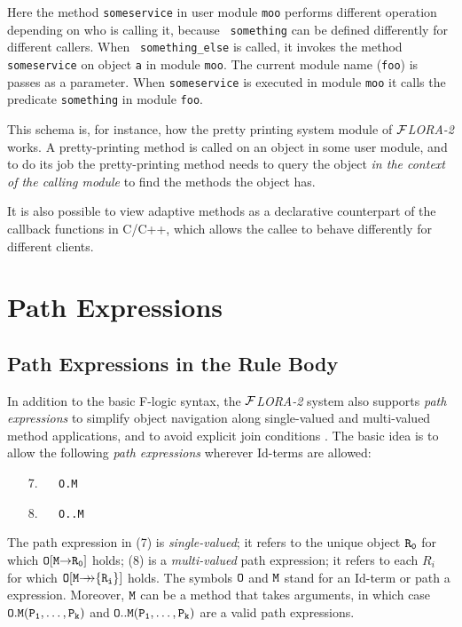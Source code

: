 \documentclass[11pt]{article}
\newcommand{\fd}{\ensuremath{{\rightarrow}}}                   %
\newcommand{\mvd}{\ensuremath{{\rightarrow\!\!\!\!\rightarrow}}}  %
\newcommand{\FLORA}{{\mbox{${\cal F}${\small\it LORA}\rm\emph{-2}}}\xspace}
\newcommand{\fl}{\mbox{F-logic}\xspace}
\begin{document}
  Here the method {\tt someservice} in user module {\tt moo} performs
  different operation depending on who is calling it, because {\tt
    something} can be defined differently for different callers.  When {\tt
    something\_else} is called, it invokes the method {\tt someservice} on
  object {\tt a} in module {\tt moo}. The current module name ({\tt foo})
  is passes as a parameter. When {\tt someservice} is executed in module
  {\tt moo} it calls the predicate {\tt something} in module {\tt foo}.
  
  This schema is, for instance, how the pretty printing system module of
  \FLORA works. A pretty-printing method is called on an object in some
  user module, and to do its job the pretty-printing method needs to query
  the object \emph{in the context of the calling module} to find the
  methods the object has.

It is also possible to view adaptive methods as a declarative counterpart
of the callback functions in C/C++, which allows the callee to behave
differently for different clients.


\section{Path Expressions}\label{sec-pathexpr}

\subsection{Path Expressions in the Rule Body}


 
In addition to the basic \fl syntax, the \FLORA  system also supports
\emph{path expressions} to simplify object navigation along
single-valued and multi-valued method applications, and to avoid
explicit join conditions \cite{frohn-lausen-uphoff-VLDB-94}.  The
basic idea is to allow the following \emph{path expressions} wherever
Id-terms are allowed:

  \medskip

\begin{enumerate} 
\item[7.]\label{eq-path-fun} ~~ {\tt O.M}
\item[8.]\label{eq-path-set} ~~ {\tt O..M} 
\end{enumerate} \medskip

\noindent
The path expression in (7) is \emph{single-valued}; it refers to the unique
object $\tt R_0$ for which $\tt O[M\fd R_0]$ holds; (8) is a
\emph{multi-valued} path expression; it refers to each $R_i$ for which $\tt
O[M\mvd\{R_i\}]$ holds.  The symbols $\tt O$ and $\tt M$ stand for an
Id-term or path a expression.  Moreover, $\tt M$ can be a method that takes
arguments, in which case $\tt O.M(P_1,\dots,P_k)$ and $\tt
O..M(P_1,\dots,P_k)$ are a valid path expressions.
  
\end{document}
